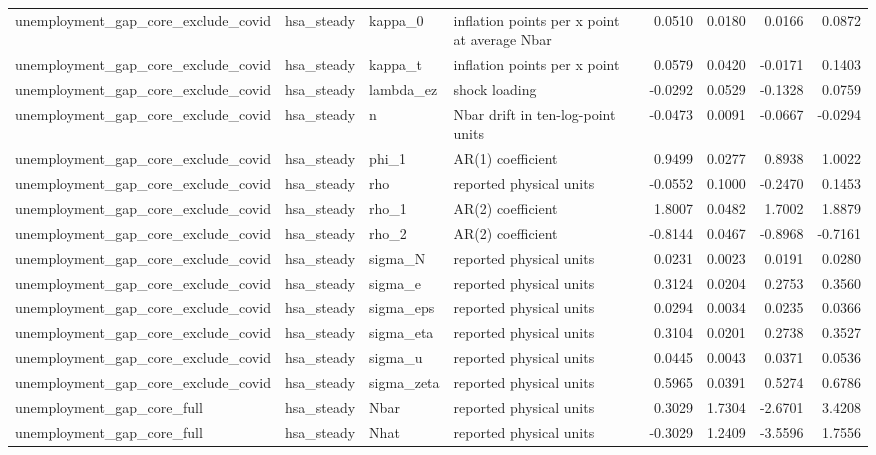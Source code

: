 \begin{tabular}{llllrrrr}
unemployment\_gap\_core\_exclude\_covid & hsa\_steady & kappa\_0 & inflation points per x point at average Nbar & 0.0510 & 0.0180 & 0.0166 & 0.0872 \\
unemployment\_gap\_core\_exclude\_covid & hsa\_steady & kappa\_t & inflation points per x point & 0.0579 & 0.0420 & -0.0171 & 0.1403 \\
unemployment\_gap\_core\_exclude\_covid & hsa\_steady & lambda\_ez & shock loading & -0.0292 & 0.0529 & -0.1328 & 0.0759 \\
unemployment\_gap\_core\_exclude\_covid & hsa\_steady & n & Nbar drift in ten-log-point units & -0.0473 & 0.0091 & -0.0667 & -0.0294 \\
unemployment\_gap\_core\_exclude\_covid & hsa\_steady & phi\_1 & AR(1) coefficient & 0.9499 & 0.0277 & 0.8938 & 1.0022 \\
unemployment\_gap\_core\_exclude\_covid & hsa\_steady & rho & reported physical units & -0.0552 & 0.1000 & -0.2470 & 0.1453 \\
unemployment\_gap\_core\_exclude\_covid & hsa\_steady & rho\_1 & AR(2) coefficient & 1.8007 & 0.0482 & 1.7002 & 1.8879 \\
unemployment\_gap\_core\_exclude\_covid & hsa\_steady & rho\_2 & AR(2) coefficient & -0.8144 & 0.0467 & -0.8968 & -0.7161 \\
unemployment\_gap\_core\_exclude\_covid & hsa\_steady & sigma\_N & reported physical units & 0.0231 & 0.0023 & 0.0191 & 0.0280 \\
unemployment\_gap\_core\_exclude\_covid & hsa\_steady & sigma\_e & reported physical units & 0.3124 & 0.0204 & 0.2753 & 0.3560 \\
unemployment\_gap\_core\_exclude\_covid & hsa\_steady & sigma\_eps & reported physical units & 0.0294 & 0.0034 & 0.0235 & 0.0366 \\
unemployment\_gap\_core\_exclude\_covid & hsa\_steady & sigma\_eta & reported physical units & 0.3104 & 0.0201 & 0.2738 & 0.3527 \\
unemployment\_gap\_core\_exclude\_covid & hsa\_steady & sigma\_u & reported physical units & 0.0445 & 0.0043 & 0.0371 & 0.0536 \\
unemployment\_gap\_core\_exclude\_covid & hsa\_steady & sigma\_zeta & reported physical units & 0.5965 & 0.0391 & 0.5274 & 0.6786 \\
unemployment\_gap\_core\_full & hsa\_steady & Nbar & reported physical units & 0.3029 & 1.7304 & -2.6701 & 3.4208 \\
unemployment\_gap\_core\_full & hsa\_steady & Nhat & reported physical units & -0.3029 & 1.2409 & -3.5596 & 1.7556 \\

\end{tabular}
